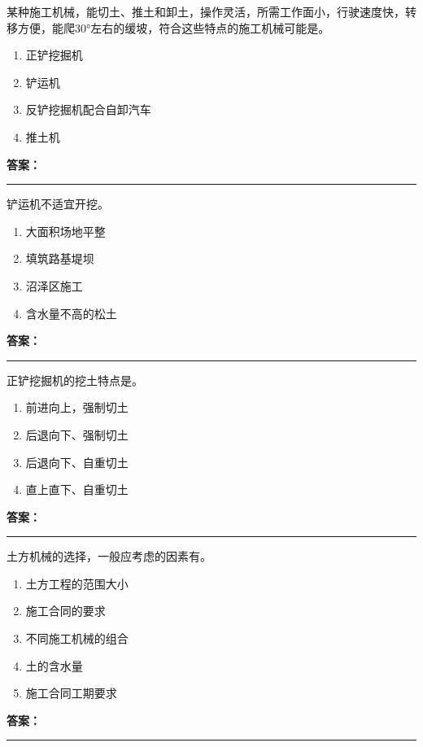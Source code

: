 \documentclass[UTF8,fontset=fandol,11pt]{ctexart}
\newcommand{\answerline}{\textcolor{answerred}{\rule{2.4cm}{0.7pt}}}
\begin{document}
\vspace{0.2em}

\begin{quizbox}[title={第 4 题}]
某种施工机械，能切土、推土和卸土，操作灵活，所需工作面小，行驶速度快，转移方便，能爬30°左右的缓坡，符合这些特点的施工机械可能是。\\
\begin{enumerate}[label=\Alph*.]
\item 正铲挖掘机
\item 铲运机
\item 反铲挖掘机配合自卸汽车
\item 推土机
\end{enumerate}
\textbf{\textcolor{answerred}{答案：}} \answerline
\end{quizbox}

\vspace{0.2em}

\begin{quizbox}[title={第 5 题}]
铲运机不适宜开挖。\\
\begin{enumerate}[label=\Alph*.]
\item 大面积场地平整
\item 填筑路基堤坝
\item 沼泽区施工
\item 含水量不高的松土
\end{enumerate}
\textbf{\textcolor{answerred}{答案：}} \answerline
\end{quizbox}

\vspace{0.2em}

\begin{quizbox}[title={第 6 题}]
正铲挖掘机的挖土特点是。\\
\begin{enumerate}[label=\Alph*.]
\item 前进向上，强制切土
\item 后退向下、强制切土
\item 后退向下、自重切土
\item 直上直下、自重切土
\end{enumerate}
\textbf{\textcolor{answerred}{答案：}} \answerline
\end{quizbox}

\vspace{0.2em}

\begin{quizbox}[title={第 7 题}]
土方机械的选择，一般应考虑的因素有。\\
\begin{enumerate}[label=\Alph*.]
\item 土方工程的范围大小
\item 施工合同的要求
\item 不同施工机械的组合
\item 土的含水量
\item 施工合同工期要求
\end{enumerate}
\textbf{\textcolor{answerred}{答案：}} \answerline
\end{quizbox}
\end{document}
